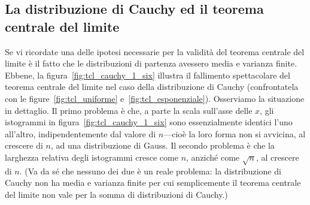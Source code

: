 \subsection{La distribuzione di Cauchy ed il teorema centrale del limite}

Se vi ricordate una delle ipotesi necessarie per la validità del teorema
centrale del limite è il fatto che le distribuzioni di partenza avessero
media e varianza finite. Ebbene, la figura~\ref{fig:tcl_cauchy_1_six}
illustra il fallimento spettacolare del teorema centrale del limite nel caso
della distribuzione di Cauchy (confrontatela con le
figure~\ref{fig:tcl_uniforme} e~\ref{fig:tcl_esponenziale}).
Osserviamo la situazione in dettaglio. Il primo problema è che, a parte la
scala sull'asse delle $x$, gli istogrammi in figura~\ref{fig:tcl_cauchy_1_six}
sono essenzialmente identici l'uno all'altro, indipendentemente dal valore di
$n$---cioè la loro forma non si avvicina, al crescere di $n$, ad una
distribuzione di Gauss. Il secondo problema è che la larghezza relativa degli
istogrammi cresce come $n$, anziché come $\sqrt{n}$, al crescere di $n$.
(Va da sé che nessuno dei due è un reale problema: la distribuzione di
Cauchy non ha media e varianza finite per cui semplicemente il teorema centrale
del limite non vale per la somma di distribuzioni di Cauchy.)


